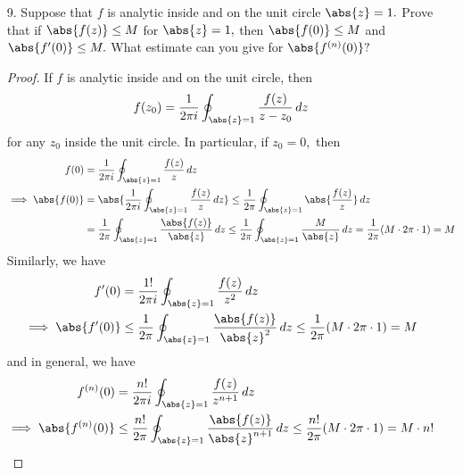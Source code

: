 \documentclass{article}
\begin{document}
\begin{itemize}
	\item[9.] Suppose that $f$ is analytic inside and on the unit circle $\abs{z}=1.$ Prove that if $\abs{f(z)}\le M$ for $\abs{z}=1,$ then $\abs{f(0)}\le M$ and $\abs{f'(0)}\le M.$ What estimate can you give for $\abs{f^{(n)}(0)}?$
		\begin{proof}
			If $f$ is analytic inside and on the unit circle, then
			\begin{align*}
				f(z_0) = \frac{1}{2\pi i} \oint_{\abs{z}=1} \frac{f(z)}{z-z_0}\, dz
			\end{align*}
			for any $z_0$ inside the unit circle. In particular, if $z_0=0,$ then
			\begin{align*}
				f(0) &= \frac{1}{2\pi i} \oint_{\abs{z}=1} \frac{f(z)}{z}\, dz \\
				\implies \abs{f(0)} &= \abs{\frac{1}{2\pi i} \oint_{\abs{z}=1} \frac{f(z)}{z}\, dz} \le \frac{1}{2\pi} \oint_{\abs{z}=1} \abs{\frac{f(z)}{z}}\, dz \\
				&= \frac{1}{2\pi} \oint_{\abs{z}=1} \frac{\abs{f(z)}}{\abs{z}}\, dz \le \frac{1}{2\pi} \oint_{\abs{z}=1} \frac{M}{\abs{z}}\, dz = \frac{1}{2\pi} (M\cdot 2\pi\cdot 1) = M
			\end{align*}
			Similarly, we have
			\begin{align*}
				f'(0) &= \frac{1!}{2\pi i}\oint_{\abs{z}=1} \frac{f(z)}{z^2}\, dz \\
				\implies \abs{f'(0)} &\le \frac{1}{2\pi} \oint_{\abs{z}=1} \frac{\abs{f(z)}}{ \abs{z}^2}\, dz \le \frac{1}{2\pi} (M\cdot 2\pi \cdot 1) = M
			\end{align*}
			and in general, we have
			\begin{align*}
				f^{(n)}(0) &= \frac{n!}{2\pi i} \oint_{\abs{z}=1} \frac{f(z)}{z^{n+1}}\, dz \\
				\implies \abs{f^{(n)}(0)} &\le \frac{n!}{2\pi} \oint_{\abs{z}=1} \frac{\abs{f(z)}}{\abs{z}^{n+1}}\, dz \le \frac{n!}{2\pi}(M\cdot 2\pi \cdot 1) = M\cdot n!
			\end{align*}
		\end{proof}
		
\end{itemize}
\end{document}
